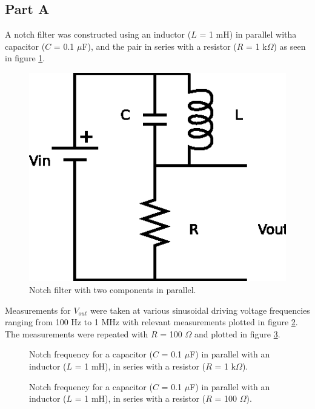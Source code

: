 \documentclass[11pt,onecolumn]{article}
\begin{document}
\subsection{Part A}
A notch filter was constructed using an inductor ($L$ = 1 mH) in parallel witha capacitor ($C$ = 0.1 $\mu$F), and the pair in series with a resistor ($R$ = 1 k$\Omega$) as seen in figure \ref{fig:Notch_Filter}.
\begin{figure}
\begin{center}
\includegraphics{Diagram1.eps}
\end{center}
\caption{Notch filter with two components in parallel.}\label{fig:Notch_Filter}
\end{figure}

Measurements for $V_{out}$ were taken at various sinusoidal driving voltage frequencies ranging from 100 Hz to 1 MHz with relevant measurements plotted in figure \ref{fig:plot01}. The measurements were repeated with $R$ = 100 $\Omega$ and plotted in figure \ref{fig:plot02}.
\begin{figure}
\begin{center}

\end{center}
\caption{Notch frequency for a capacitor ($C$ = 0.1 $\mu$F) in parallel with an inductor ($L$ = 1 mH), in series with a resistor ($R$ = 1 k$\Omega$).}\label{fig:plot01}
\end{figure}
\begin{figure}
\begin{center}

\end{center}
\caption{Notch frequency for a capacitor ($C$ = 0.1 $\mu$F) in parallel with an inductor ($L$ = 1 mH), in series with a resistor ($R$ = 100 $\Omega$).}\label{fig:plot02}
\end{figure}
\end{document}
